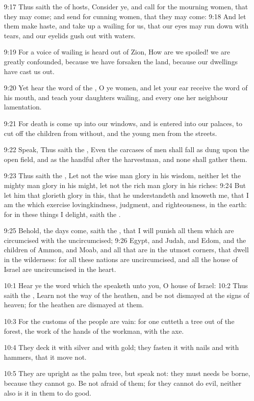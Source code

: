 9:17 Thus saith the \LORD of hosts, Consider ye, and call for the mourning women, that they may come; and send for cunning women, that they may come: 9:18 And let them make haste, and take up a wailing for us, that our eyes may run down with tears, and our eyelids gush out with waters.

9:19 For a voice of wailing is heard out of Zion, How are we spoiled!  we are greatly confounded, because we have forsaken the land, because our dwellings have cast us out.

9:20 Yet hear the word of the \LORD, O ye women, and let your ear receive the word of his mouth, and teach your daughters wailing, and every one her neighbour lamentation.

9:21 For death is come up into our windows, and is entered into our palaces, to cut off the children from without, and the young men from the streets.

9:22 Speak, Thus saith the \LORD, Even the carcases of men shall fall as dung upon the open field, and as the handful after the harvestman, and none shall gather them.

9:23 Thus saith the \LORD, Let not the wise man glory in his wisdom, neither let the mighty man glory in his might, let not the rich man glory in his riches: 9:24 But let him that glorieth glory in this, that he understandeth and knoweth me, that I am the \LORD which exercise lovingkindness, judgment, and righteousness, in the earth: for in these things I delight, saith the \LORD.

9:25 Behold, the days come, saith the \LORD, that I will punish all them which are circumcised with the uncircumcised; 9:26 Egypt, and Judah, and Edom, and the children of Ammon, and Moab, and all that are in the utmost corners, that dwell in the wilderness: for all these nations are uncircumcised, and all the house of Israel are uncircumcised in the heart.

10:1 Hear ye the word which the \LORD speaketh unto you, O house of Israel: 10:2 Thus saith the \LORD, Learn not the way of the heathen, and be not dismayed at the signs of heaven; for the heathen are dismayed at them.

10:3 For the customs of the people are vain: for one cutteth a tree out of the forest, the work of the hands of the workman, with the axe.

10:4 They deck it with silver and with gold; they fasten it with nails and with hammers, that it move not.

10:5 They are upright as the palm tree, but speak not: they must needs be borne, because they cannot go. Be not afraid of them; for they cannot do evil, neither also is it in them to do good.

